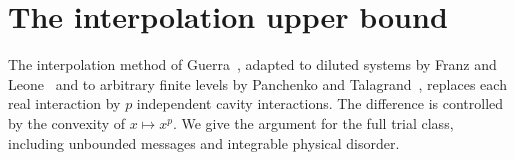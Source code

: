 \section{The interpolation upper bound}\label{upper:section}

The interpolation method of Guerra~\cite{Guerra03}, adapted to diluted
systems by Franz and Leone~\cite{FL03} and to arbitrary finite levels by
Panchenko and Talagrand~\cite{PT04}, replaces each real interaction by
$p$ independent cavity interactions. The difference is
controlled by the convexity of $x\mapsto x^p$. We give the argument for
the full trial class, including unbounded messages and integrable
physical disorder.


